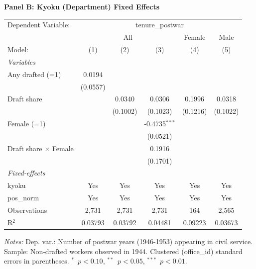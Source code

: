 \begin{table}[htbp]
\begin{threeparttable}
\begin{tabular}{lccccc}
\end{tabular}
\par\endgroup
\vspace{2ex}
\textbf{Panel B: Kyoku (Department) Fixed Effects}\\[1ex]
\begingroup
\centering
\begin{tabular}{lccccc}
   \tabularnewline \midrule \midrule
   Dependent Variable: & \multicolumn{5}{c}{tenure\_postwar}\\
    & \multicolumn{3}{c}{All} & Female & Male \\ 
   Model:                       & (1)      & (2)      & (3)             & (4)      & (5)\\  
   \midrule
   \emph{Variables}\\
   Any drafted (=1)             & 0.0194   &          &                 &          &   \\   
                                & (0.0557) &          &                 &          &   \\   
   Draft share                  &          & 0.0340   & 0.0306          & 0.1996   & 0.0318\\   
                                &          & (0.1002) & (0.1023)        & (0.1216) & (0.1022)\\   
   Female (=1)                  &          &          & -0.4735$^{***}$ &          &   \\   
                                &          &          & (0.0521)        &          &   \\   
   Draft share $\times$ Female  &          &          & 0.1916          &          &   \\   
                                &          &          & (0.1701)        &          &   \\   
   \midrule
   \emph{Fixed-effects}\\
   kyoku                        & Yes      & Yes      & Yes             & Yes      & Yes\\  
   pos\_norm                    & Yes      & Yes      & Yes             & Yes      & Yes\\  
   \midrule
   Observations                 & 2,731    & 2,731    & 2,731           & 164      & 2,565\\  
   R$^2$                        & 0.03793  & 0.03792  & 0.04481         & 0.09223  & 0.03673\\  
   \midrule \midrule
\end{tabular}
\par\endgroup
\begin{tablenotes}[flushleft]
\footnotesize
\item \textit{Notes:} Dep. var.: Number of postwar years (1946-1953) appearing in civil service. Sample: Non-drafted workers observed in 1944. Clustered (office\_id) standard errors in parentheses. $^{*}$~$p<0.10$, $^{**}$~$p<0.05$, $^{***}$~$p<0.01$.
\end{tablenotes}
\end{threeparttable}
\end{table}
